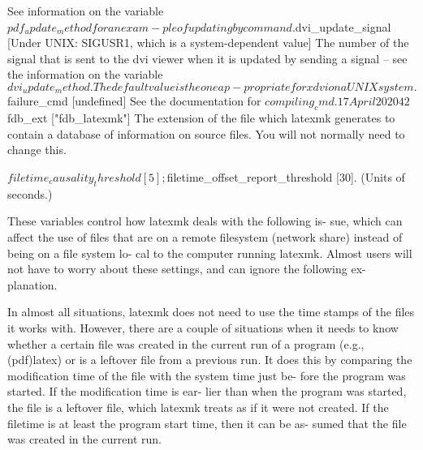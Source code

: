               See  information on the variable $pdf_update_method for an exam-
              ple of updating by command.

       $dvi_update_signal [Under UNIX: SIGUSR1, which  is  a  system-dependent
       value]
              The  number of the signal that is sent to the dvi viewer when it
              is updated by sending a signal -- see  the  information  on  the
              variable  $dvi_update_method.   The default value is the one ap-
              propriate for xdvi on a UNIX system.

       $failure_cmd [undefined]
              See the documentation for $compiling_cmd.




                                 17 April 2020                              42








       $fdb_ext ["fdb_latexmk"]
              The extension of the file which latexmk generates to  contain  a
              database  of information on source files.  You will not normally
              need to change this.

       $filetime_causality_threshold  [5];   $filetime_offset_report_threshold
       [30]. (Units of seconds.)

              These variables control how latexmk deals with the following is-
              sue, which can affect the use of files  that  are  on  a  remote
              filesystem (network share) instead of being on a file system lo-
              cal to the computer running latexmk.  Almost users will not have
              to  worry about these settings, and can ignore the following ex-
              planation.

              In almost all situations, latexmk does not need to use the  time
              stamps  of the files it works with.  However, there are a couple
              of situations when it needs to know whether a certain  file  was
              created in the current run of a program (e.g., (pdf)latex) or is
              a leftover file from a previous run. It does this  by  comparing
              the  modification time of the file with the system time just be-
              fore the program was started. If the modification time  is  ear-
              lier  than  when the program was started, the file is a leftover
              file, which latexmk treats as if it were not  created.   If  the
              filetime  is at least the program start time, then it can be as-
              sumed that the file was created in the current run.

